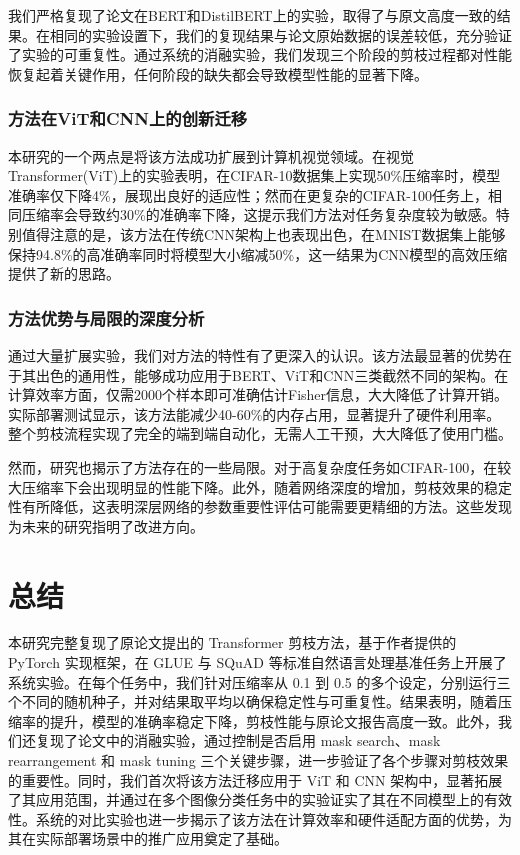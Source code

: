 \documentclass[UTF8,openany]{ctexbook}
\begin{document}
我们严格复现了论文在BERT和DistilBERT上的实验，取得了与原文高度一致的结果。在相同的实验设置下，我们的复现结果与论文原始数据的误差较低，充分验证了实验的可重复性。通过系统的消融实验，我们发现三个阶段的剪枝过程都对性能恢复起着关键作用，任何阶段的缺失都会导致模型性能的显著下降。

\subsection{方法在ViT和CNN上的创新迁移}

本研究的一个两点是将该方法成功扩展到计算机视觉领域。在视觉Transformer(ViT)上的实验表明，在CIFAR-10数据集上实现50\%压缩率时，模型准确率仅下降4\%，展现出良好的适应性；然而在更复杂的CIFAR-100任务上，相同压缩率会导致约30\%的准确率下降，这提示我们方法对任务复杂度较为敏感。特别值得注意的是，该方法在传统CNN架构上也表现出色，在MNIST数据集上能够保持94.8\%的高准确率同时将模型大小缩减50\%，这一结果为CNN模型的高效压缩提供了新的思路。

\subsection{方法优势与局限的深度分析}

通过大量扩展实验，我们对方法的特性有了更深入的认识。该方法最显著的优势在于其出色的通用性，能够成功应用于BERT、ViT和CNN三类截然不同的架构。在计算效率方面，仅需2000个样本即可准确估计Fisher信息，大大降低了计算开销。实际部署测试显示，该方法能减少40-60\%的内存占用，显著提升了硬件利用率。整个剪枝流程实现了完全的端到端自动化，无需人工干预，大大降低了使用门槛。

然而，研究也揭示了方法存在的一些局限。对于高复杂度任务如CIFAR-100，在较大压缩率下会出现明显的性能下降。此外，随着网络深度的增加，剪枝效果的稳定性有所降低，这表明深层网络的参数重要性评估可能需要更精细的方法。这些发现为未来的研究指明了改进方向。

\chapter{总结}
本研究完整复现了原论文提出的 Transformer 剪枝方法，基于作者提供的 PyTorch 实现框架，在 GLUE 与 SQuAD 等标准自然语言处理基准任务上开展了系统实验。在每个任务中，我们针对压缩率从 0.1 到 0.5 的多个设定，分别运行三个不同的随机种子，并对结果取平均以确保稳定性与可重复性。结果表明，随着压缩率的提升，模型的准确率稳定下降，剪枝性能与原论文报告高度一致。此外，我们还复现了论文中的消融实验，通过控制是否启用 mask search、mask rearrangement 和 mask tuning 三个关键步骤，进一步验证了各个步骤对剪枝效果的重要性。同时，我们首次将该方法迁移应用于 ViT 和 CNN 架构中，显著拓展了其应用范围，并通过在多个图像分类任务中的实验证实了其在不同模型上的有效性。系统的对比实验也进一步揭示了该方法在计算效率和硬件适配方面的优势，为其在实际部署场景中的推广应用奠定了基础。
\end{document}
